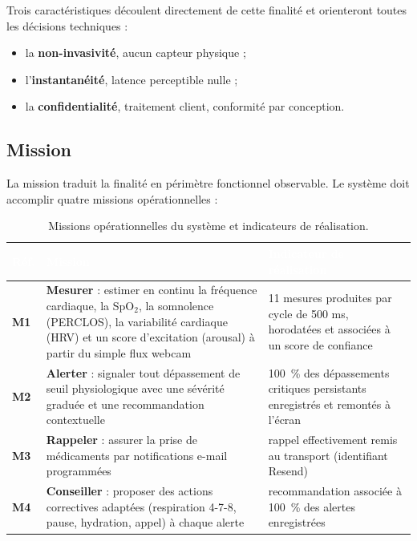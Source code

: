 \documentclass[11pt,a4paper]{article}
\begin{document}
Trois caractéristiques découlent directement de cette finalité et orienteront toutes les décisions
techniques :
\begin{itemize}[leftmargin=1.5em,itemsep=1pt,topsep=2pt,parsep=0pt]
 \item la \textbf{non-invasivité}, aucun capteur physique ;
 \item l'\textbf{instantanéité}, latence perceptible nulle ;
 \item la \textbf{confidentialité}, traitement client, conformité par conception.
\end{itemize}

\subsection{Mission}
\label{sec:mission}
La mission traduit la finalité en périmètre fonctionnel observable. Le système doit accomplir quatre
missions opérationnelles :

\begin{table}[H]
\centering\small
\begin{tabularx}{\linewidth}{>{\bfseries}l X X}
\toprule
\rowcolor{cwblue} \textcolor{white}{\bf Réf.} & \textcolor{white}{\bf Mission} & \textcolor{white}{\bf Indicateur de
réalisation} \\
\midrule
M1 & \textbf{Mesurer} : estimer en continu la fréquence cardiaque, la SpO$_2$, la somnolence
 (PERCLOS), la variabilité cardiaque (HRV) et un score d'excitation (arousal) à partir du simple flux
 webcam & 11 mesures produites par cycle de 500 ms, horodatées et associées à un score de confiance \\
M2 & \textbf{Alerter} : signaler tout dépassement de seuil physiologique avec une sévérité graduée et
 une recommandation contextuelle & 100~\% des dépassements critiques persistants enregistrés et
 remontés à l'écran \\
M3 & \textbf{Rappeler} : assurer la prise de médicaments par notifications e-mail programmées &
 rappel effectivement remis au transport (identifiant Resend) \\
M4 & \textbf{Conseiller} : proposer des actions correctives adaptées (respiration 4-7-8, pause,
 hydration, appel) à chaque alerte & recommandation associée à 100~\% des alertes enregistrées \\
\bottomrule
\end{tabularx}
\caption{Missions opérationnelles du système et indicateurs de réalisation.}
\label{tab:missions}
\end{table}
\end{document}
